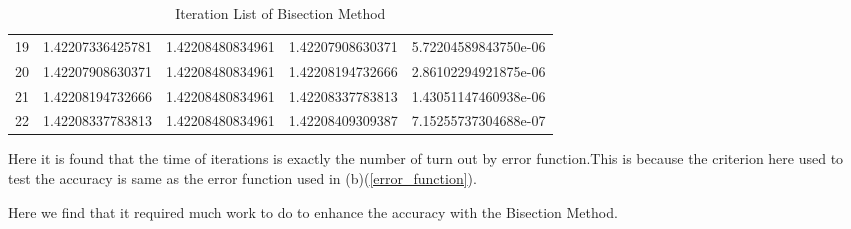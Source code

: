 \begin{solution}
\begin{enumerate}[label=(\alph*)]
\begin{table}[htb]
\begin{tabular}{@{}lllll@{}}
19 & 1.42207336425781  & 1.42208480834961 & 1.42207908630371  & 5.72204589843750e-06 \\
20 & 1.42207908630371  & 1.42208480834961 & 1.42208194732666  & 2.86102294921875e-06 \\
21 & 1.42208194732666  & 1.42208480834961 & 1.42208337783813  & 1.43051147460938e-06 \\
22 & 1.42208337783813  & 1.42208480834961 & 1.42208409309387  & 7.15255737304688e-07 \\ \bottomrule
\end{tabular}
\caption{Iteration List of Bisection Method} \label{result_sheet}
\end{table}


Here it is found that the time of iterations is exactly the number of turn out by error function.This is because the criterion here used to test the accuracy is same as the error function used in (b)(\ref{error_function}). 


Here we find that it required much work to do to enhance the accuracy with the Bisection Method.




\end{enumerate}










\end{solution}


